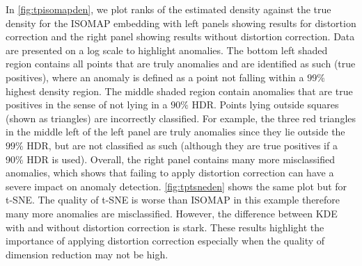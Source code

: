 \documentclass[11pt,a4paper,]{article}
\begin{document}
In \autoref{fig:tpisomapden}, we plot ranks of the estimated density against the true density for the ISOMAP embedding with left panels showing results for distortion correction and the right panel showing results without distortion correction. Data are presented on a log scale to highlight anomalies. The bottom left shaded region contains all points that are truly anomalies and are identified as such (true positives), where an anomaly is defined as a point not falling within a \(99\%\) highest density region. The middle shaded region contain anomalies that are true positives in the sense of not lying in a \(90\%\) HDR. Points lying outside squares (shown as triangles) are incorrectly classified. For example, the three red triangles in the middle left of the left panel are truly anomalies since they lie outside the \(99\%\) HDR, but are not classified as such (although they are true positives if a 90\% HDR is used). Overall, the right panel contains many more misclassified anomalies, which shows that failing to apply distortion correction can have a severe impact on anomaly detection. \autoref{fig:tptsneden} shows the same plot but for t-SNE. The quality of t-SNE is worse than ISOMAP in this example therefore many more anomalies are misclassified. However, the difference between KDE with and without distortion correction is stark. These results highlight the importance of applying distortion correction especially when the quality of dimension reduction may not be high.
\end{document}
